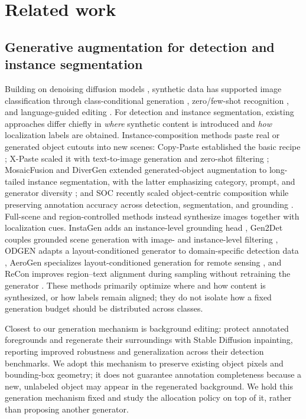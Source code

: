 \documentclass[preprint,12pt,authoryear]{elsarticle}
\begin{document}
\section{Related work}\label{sec:related}

\subsection{Generative augmentation for detection and instance segmentation}
Building on denoising diffusion models \citep{ho2020ddpm,
rombach2022ldm}, synthetic data has supported image classification
through class-conditional generation \citep{azizi2023synthetic},
zero/few-shot recognition \citep{he2023synthetic}, and language-guided
editing \citep{trabucco2024dafusion, dunlap2023alia}. For detection and
instance segmentation, existing approaches differ chiefly in
\emph{where} synthetic content is introduced and \emph{how} localization
labels are obtained. Instance-composition methods paste real or generated
object cutouts into new scenes: Copy-Paste established the basic recipe
\citep{ghiasi2021copy}; X-Paste scaled it with text-to-image generation
and zero-shot filtering \citep{zhao2023xpaste}; MosaicFusion and DiverGen
extended generated-object augmentation to long-tailed instance
segmentation, with the latter emphasizing category, prompt, and generator
diversity \citep{xie2025mosaicfusion, fan2024divergen}; and SOC recently
scaled object-centric composition while preserving annotation accuracy
across detection, segmentation, and grounding \citep{huang2026soc}.
Full-scene and region-controlled methods
instead synthesize images together with localization cues. InstaGen adds
an instance-level grounding head \citep{feng2024instagen}, Gen2Det couples
grounded scene generation with image- and instance-level filtering
\citep{suri2024gen2det}, ODGEN adapts a layout-conditioned generator to
domain-specific detection data \citep{zhu2024odgen}, AeroGen specializes
layout-conditioned generation for remote sensing
\citep{tang2025aerogen}, and ReCon improves region--text alignment during
sampling without retraining the generator \citep{zhu2025recon}. These
methods primarily optimize where and how content is synthesized, or how
labels remain aligned; they do not isolate how a fixed generation
budget should be distributed across classes.

Closest to our generation mechanism is background editing:
\citet{li2024background} protect annotated foregrounds and regenerate
their surroundings with Stable Diffusion inpainting, reporting improved
robustness and generalization across their detection benchmarks. We adopt
this mechanism to preserve existing object pixels and bounding-box
geometry; it does not guarantee annotation completeness because a new,
unlabeled object may appear in the regenerated background. We hold this
generation mechanism fixed and study the allocation policy on top of
it, rather than proposing another generator.
\end{document}
